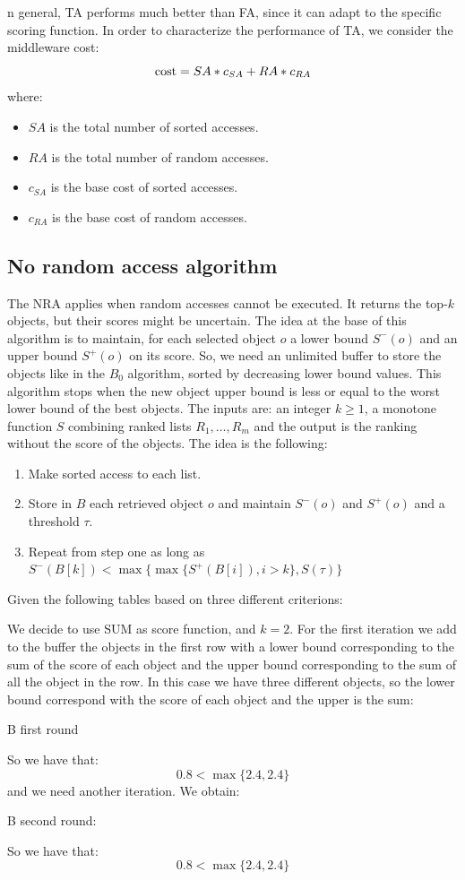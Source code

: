 \documentclass[12pt, a4paper]{report}
\newtheorem[style=M,bodystyle=\normalfont]{theorem}{Theorem}
\newtheorem[style=M,bodystyle=\normalfont]{corollary}{Corollary}
\newtheorem[style=M,bodystyle=\normalfont]{lemma}{Lemma}
\newtheorem[style=M,bodystyle=\normalfont]{definition}{Definition}
\begin{document}
    n general, TA performs much better than FA, since it can adapt to the specific scoring function. In order to characterize the 
    performance of TA, we consider the middleware cost: 
    \[\textnormal{cost} = SA*c_{SA} + RA*c_{RA}\]
    where:
    \begin{itemize}
        \item $SA$ is the total number of sorted accesses.
        \item $RA$ is the total number of random accesses.
        \item $c_{SA}$ is the base cost of sorted accesses.
        \item $c_{RA}$ is the base cost of random accesses.
    \end{itemize}

    \subsection{No random access algorithm}
    The NRA applies when random accesses cannot be executed. It returns the top-$k$ objects, but their 
    scores might be uncertain. The idea at the base of this algorithm is to maintain, for each selected object
    $o$ a lower bound $S^{-}(o)$ and an upper bound $S^{+}(o)$ on its score. So, we need an unlimited buffer to 
    store the objects like in the $B_0$ algorithm, sorted by decreasing lower bound values. This algorithm 
    stops when the new object upper bound is less or equal to the worst lower bound of the best objects. The inputs are: 
    an integer $k \geq 1$, a monotone function $S$ combining ranked lists $R_1, \dots, R_m$ and the output is the ranking
    without the score of the objects. The idea is the following: 
    \begin{enumerate}
        \item Make sorted access to each list. 
        \item Store in $B$ each retrieved object $o$ and maintain $S^{-}(o)$ and $S^{+}(o)$ and a threshold $\tau$. 
        \item Repeat from step one as long as $S^{-}(B[k]) < \max\{ \max\{S^{+}(B[i]), i > k\}, S(\tau) \}$
    \end{enumerate}
    \begin{example}
        Given the following tables based on three different criterions: 

        We decide to use SUM as score function, and $k=2$. For the first iteration we add to the buffer the 
        objects in the first row with a lower bound corresponding to the sum of the score of each object and the 
        upper bound corresponding to the sum of all the object in the row. In this case we have three different 
        objects, so the lower bound correspond with the score of each object and the upper is the sum: 

        B first round 

        So we have that: 
        \[0.8<\max\{2.4,2.4\}\]
        and we need another iteration. We obtain:

        B second round: 

        So we have that:
        \[0.8<\max\{2.4,2.4\}\]
    \end{example}
\end{document}
